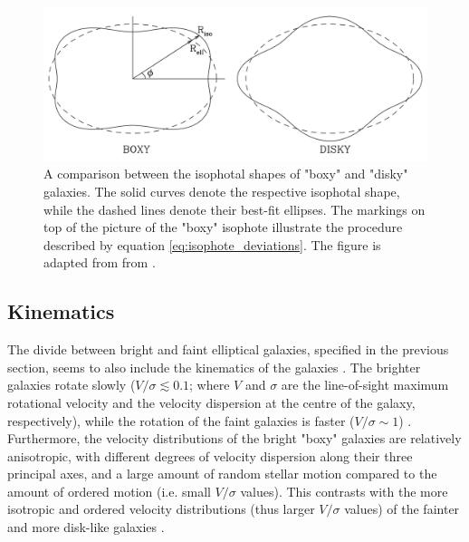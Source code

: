 \documentclass[english, twoside]{HYgradu}
\begin{document}
\begin{figure}
	\centering
	\includegraphics[width=\textwidth]{boxy_and_disky_GFE.png}
	\caption{A comparison between the isophotal shapes of "boxy" and "disky" galaxies. The solid curves denote the respective isophotal shape, while the dashed lines denote their best-fit ellipses. The markings on top of the picture of the "boxy" isophote illustrate the procedure described by equation \ref{eq:isophote_deviations}. The figure is adapted from from \cite{GalaxyFormationAndEvo2010}.}
	\label{figure:isophotes}
\end{figure}

\subsection{Kinematics} \label{section:ellip_kinematics}

The divide between bright and faint elliptical galaxies, specified in the previous section, seems to also include the kinematics of the galaxies \citep[discussed in e.g.][]{GalaxyFormationAndEvo2010}. The brighter galaxies rotate slowly ($V/\sigma \lesssim 0.1$; where $V$ and $\sigma$ are the line-of-sight maximum rotational velocity and the velocity dispersion at the centre of the galaxy, respectively), while the rotation of the faint galaxies is faster ($V/\sigma \sim 1$) \citep{Davies1983, Cappellari2007}. Furthermore, the velocity distributions of the bright "boxy" galaxies are relatively anisotropic, with different degrees of velocity dispersion along their three principal axes, and a large amount of random stellar motion compared to the amount of ordered motion (i.e. small $V/\sigma$ values). This contrasts with the more isotropic and ordered velocity distributions (thus larger $V/\sigma$ values) of the fainter and more disk-like galaxies \citep{Kormendy2009, Krajnovic2008}. 
\end{document}
